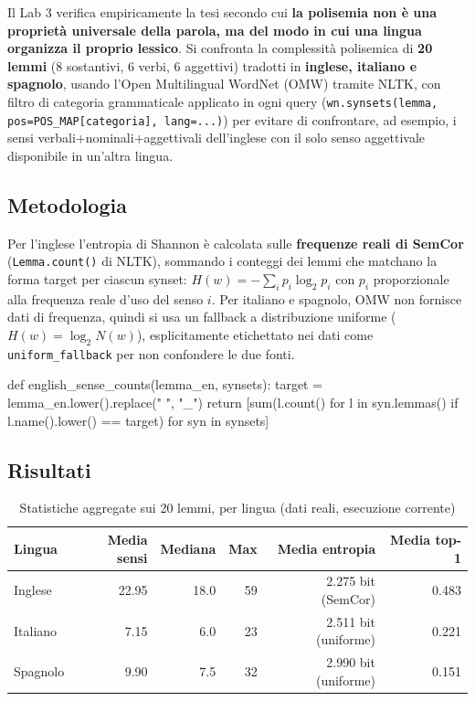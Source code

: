 \documentclass[12pt,a4paper]{article}
\begin{document}
Il Lab 3 verifica empiricamente la tesi secondo cui \textbf{la polisemia non \`e una propriet\`a universale della parola, ma del modo in cui una lingua organizza il proprio lessico}. Si confronta la complessit\`a polisemica di \textbf{20 lemmi} (8 sostantivi, 6 verbi, 6 aggettivi) tradotti in \textbf{inglese, italiano e spagnolo}, usando l'Open Multilingual WordNet (OMW) tramite NLTK, con filtro di categoria grammaticale applicato in ogni query (\texttt{wn.synsets(lemma, pos=POS\_MAP[categoria], lang=...)}) per evitare di confrontare, ad esempio, i sensi verbali+nominali+aggettivali dell'inglese con il solo senso aggettivale disponibile in un'altra lingua.

\subsection{Metodologia}

Per l'inglese l'entropia di Shannon \`e calcolata sulle \textbf{frequenze reali di SemCor} (\texttt{Lemma.count()} di NLTK), sommando i conteggi dei lemmi che matchano la forma target per ciascun synset: $H(w) = -\sum_i p_i \log_2 p_i$ con $p_i$ proporzionale alla frequenza reale d'uso del senso $i$. Per italiano e spagnolo, OMW non fornisce dati di frequenza, quindi si usa un fallback a distribuzione uniforme ($H(w)=\log_2 N(w)$), esplicitamente etichettato nei dati come \texttt{uniform\_fallback} per non confondere le due fonti.

\begin{pylisting}[title={Entropia reale da conteggi SemCor, solo per l'inglese}]
def english_sense_counts(lemma_en, synsets):
    target = lemma_en.lower().replace(" ", "_")
    return [sum(l.count() for l in syn.lemmas()
                if l.name().lower() == target) for syn in synsets]
\end{pylisting}

\subsection{Risultati}

\begin{table}[H]
  \centering
  \caption{Statistiche aggregate sui 20 lemmi, per lingua (dati reali, esecuzione corrente)}
  \begin{tabular}{lrrrrr}
    \toprule
    \textbf{Lingua} & \textbf{Media sensi} & \textbf{Mediana} & \textbf{Max} & \textbf{Media entropia} & \textbf{Media top-1} \\
    \midrule
    Inglese  & 22.95 & 18.0 & 59 & 2.275 bit (SemCor) & 0.483 \\
    Italiano &  7.15 &  6.0 & 23 & 2.511 bit (uniforme) & 0.221 \\
    Spagnolo &  9.90 &  7.5 & 32 & 2.990 bit (uniforme) & 0.151 \\
    \bottomrule
  \end{tabular}
\end{table}
\end{document}
